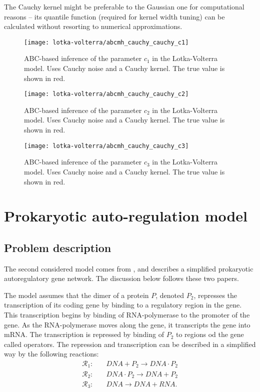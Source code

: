 The Cauchy kernel might be preferable to the Gaussian one for computational reasons -- its quantile function (required for kernel width tuning) can be calculated without resorting to numerical approximations.

\begin{figure}[htp]
    \centering
    \texttt{[image: lotka-volterra/abcmh\_cauchy\_cauchy\_c1]}
    \caption{ABC-based inference of the parameter $c_1$ in the Lotka-Volterra model. Uses Cauchy noise and a Cauchy kernel. The true value is shown in red.}
    \label{fig:lv-abcmh-cauchy-cauchy-c1}
\end{figure}

\begin{figure}[htp]
    \centering
    \texttt{[image: lotka-volterra/abcmh\_cauchy\_cauchy\_c2]}
    \caption{ABC-based inference of the parameter $c_2$ in the Lotka-Volterra model. Uses Cauchy noise and a Cauchy kernel. The true value is shown in red.}
    \label{fig:lv-abcmh-cauchy-cauchy-c2}
\end{figure}

\begin{figure}[htp]
    \centering
    \texttt{[image: lotka-volterra/abcmh\_cauchy\_cauchy\_c3]}
    \caption{ABC-based inference of the parameter $c_3$ in the Lotka-Volterra model. Uses Cauchy noise and a Cauchy kernel. The true value is shown in red.}
    \label{fig:lv-abcmh-cauchy-cauchy-c3}
\end{figure}



\section{Prokaryotic auto-regulation model} \label{sec:autoregulation}
\subsection{Problem description}
The second considered model comes from \cite{wilkinson2, wilkinson}, and describes a simplified prokaryotic autoregulatory gene network. The discussion below follows these two papers.

The model assumes that the dimer of a protein $P$, denoted $P_2$, represses the transcription of its coding gene by binding to a regulatory region in the gene. This transcription begins by binding of RNA-polymerase to the promoter of the gene. As the RNA-polymerase moves along the gene, it transcripts the gene into mRNA. The transcription is repressed by binding of $P_2$ to regions od the gene called operators. The repression and transcription can be described in a simplified way by the following reactions:
\begin{equation*}
\begin{split}
\mathcal{R}_1:\quad & \mathit{DNA} + P_2 \to \mathit{DNA} \cdot P_2 \\
\mathcal{R}_2:\quad & \mathit{DNA} \cdot P_2 \to \mathit{DNA} + P_2 \\
\mathcal{R}_3:\quad & \mathit{DNA} \to \mathit{DNA} + \mathit{RNA}.
\end{split}
\end{equation*}

